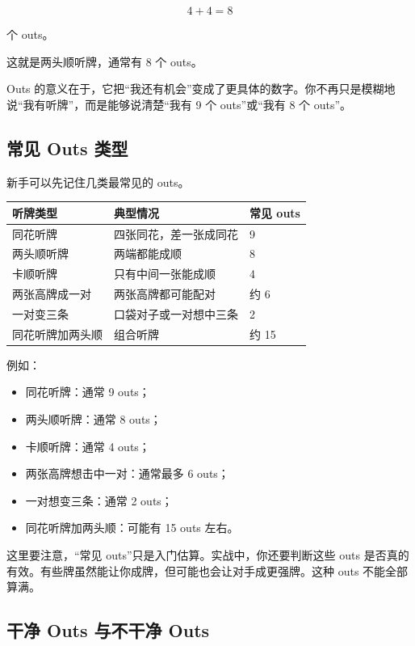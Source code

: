 \[
4 + 4 = 8
\]

个 outs。

这就是两头顺听牌，通常有 8 个 outs。

Outs 的意义在于，它把“我还有机会”变成了更具体的数字。你不再只是模糊地说“我有听牌”，而是能够说清楚“我有 9 个 outs”或“我有 8 个 outs”。

\subsection{常见 Outs 类型}

新手可以先记住几类最常见的 outs。

\begin{center}
\begin{tabular}{lll}
\toprule
\textbf{听牌类型} & \textbf{典型情况} & \textbf{常见 outs} \\
\midrule
同花听牌 & 四张同花，差一张成同花 & 9 \\
两头顺听牌 & 两端都能成顺 & 8 \\
卡顺听牌 & 只有中间一张能成顺 & 4 \\
两张高牌成一对 & 两张高牌都可能配对 & 约 6 \\
一对变三条 & 口袋对子或一对想中三条 & 2 \\
同花听牌加两头顺 & 组合听牌 & 约 15 \\
\bottomrule
\end{tabular}
\end{center}

例如：

\begin{itemize}
\item 同花听牌：通常 9 outs；
\item 两头顺听牌：通常 8 outs；
\item 卡顺听牌：通常 4 outs；
\item 两张高牌想击中一对：通常最多 6 outs；
\item 一对想变三条：通常 2 outs；
\item 同花听牌加两头顺：可能有 15 outs 左右。
\end{itemize}

这里要注意，“常见 outs”只是入门估算。实战中，你还要判断这些 outs 是否真的有效。有些牌虽然能让你成牌，但可能也会让对手成更强牌。这种 outs 不能全部算满。

\subsection{干净 Outs 与不干净 Outs}

